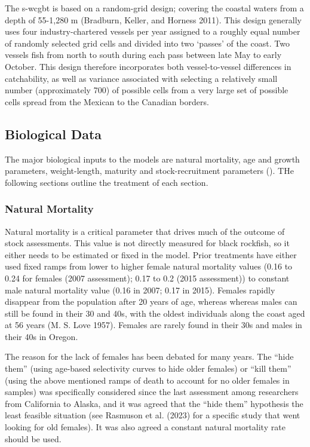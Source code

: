 \documentclass[11pt,
  english,
  letterpaper,
]{article}
\begin{document}
The \Gls{s-wcgbt} is based on a random-grid design; covering the coastal waters from a depth of 55-1,280 m (Bradburn, Keller, and Horness 2011). This design generally uses four industry-chartered vessels per year assigned to a roughly equal number of randomly selected grid cells and divided into two `passes' of the coast. Two vessels fish from north to south during each pass between late May to early October. This design therefore incorporates both vessel-to-vessel differences in catchability, as well as variance associated with selecting a relatively small number (approximately 700) of possible cells from a very large set of possible cells spread from the Mexican to the Canadian borders.

\hypertarget{biological-data}{%
\subsection{Biological Data}\label{biological-data}}

The major biological inputs to the models are natural mortality, age and growth parameters, weight-length, maturity and stock-recruitment parameters (). THe following sections outline the treatment of each section.

\hypertarget{natural-mortality}{%
\subsubsection{Natural Mortality}\label{natural-mortality}}

Natural mortality is a critical parameter that drives much of the outcome of stock assessments. This value is not directly measured for black rockfish, so it either needs to be estimated or fixed in the model. Prior treatments have either used fixed ramps from lower to higher female natural mortality values (0.16 to 0.24 for females (2007 assessment); 0.17 to 0.2 (2015 assessment)) to constant male natural mortality value (0.16 in 2007; 0.17 in 2015). Females rapidly disappear from the population after 20 years of age, whereas whereas males can still be found in their 30 and 40s, with the oldest individuals along the coast aged at 56 years (M. S. Love 1957). Females are rarely found in their 30s and males in their 40s in Oregon.

The reason for the lack of females has been debated for many years. The ``hide them'' (using age-based selectivity curves to hide older females) or ``kill them'' (using the above mentioned ramps of death to account for no older females in samples) was specifically considered since the last assessment among researchers from California to Alaska, and it was agreed that the ``hide them'' hypothesis the least feasible situation (see Rasmuson et al. (2023) for a specific study that went looking for old females). It was also agreed a constant natural mortality rate should be used.
\end{document}

